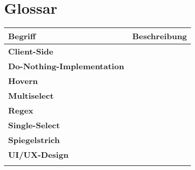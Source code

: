 \chapter{Glossar}
\label{chap:glossary}

\begin{table}[!ht]
    \label{table:Glossary}
    \footnotesize
    \begin{adjustbox}{max width=\textwidth}
        \begin{threeparttable}
            \begin{tabular}{ l | l }
                \bf{Begriff} & \bf{Beschreibung} \\
                \hline \hline
                \bf{Client-Side} &  \\
                \hline
                \bf{Do-Nothing-Implementation} &  \\
                \hline
                \bf{Hovern} &  \\
                \hline
                \bf{Multiselect} &  \\
                \hline
                \bf{Regex} &  \\
                \hline
                \bf{Single-Select} &  \\
                \hline
                \bf{Spiegelstrich} &  \\
                \hline
                \bf{UI/UX-Design} &  \\
                \hline
                \bf{} &  \\
            \end{tabular}
        \end{threeparttable}
    \end{adjustbox}
\end{table}

